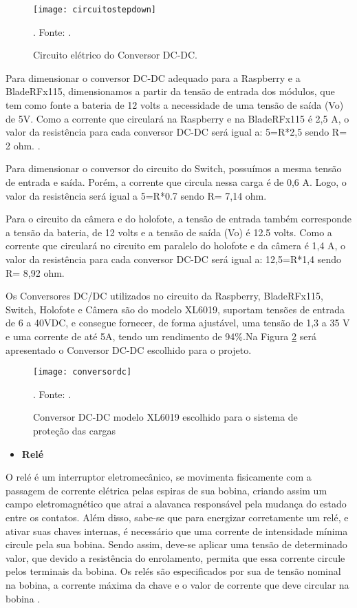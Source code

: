 \begin{figure}[H]
\centering
\texttt{[image: circuitostepdown]}
    \caption{Circuito elétrico do Conversor DC-DC.}. Fonte: \cite{Amauri}.
\label{fig:circuitostepdown}
\end{figure}
\FloatBarrier

Para dimensionar o conversor DC-DC adequado para a Raspberry e a BladeRFx115, dimensionamos a partir da tensão de entrada dos módulos, que tem como fonte a bateria de 12 volts a necessidade de uma tensão de saída (Vo) de 5V. Como a corrente que circulará na Raspberry e na BladeRFx115  é 2,5 A, o valor da resistência para cada conversor DC-DC será igual a: 5=R*2,5 sendo R= 2 ohm. \cite{MSM}.

Para dimensionar o conversor do circuito do Switch, possuímos a mesma tensão de entrada e saída. Porém, a corrente que circula nessa carga é de 0,6 A. Logo, o valor da resistência será igual a 5=R*0.7 sendo R= 7,14 ohm.

Para o circuito da câmera e do holofote, a tensão de entrada também corresponde a tensão da bateria, de 12 volts e a tensão de saída (Vo) é 12.5 volts. Como a corrente que circulará no circuito em paralelo do holofote e da câmera é 1,4 A, o valor da resistência para cada conversor DC-DC será igual a: 12,5=R*1,4 sendo R= 8,92 ohm.

Os Conversores DC/DC utilizados no circuito da Raspberry, BladeRFx115, Switch, Holofote e Câmera são do modelo XL6019, suportam tensões de entrada de 6 a 40VDC, e consegue fornecer, de forma ajustável, uma tensão de 1,3 a 35 V e uma corrente de até 5A, tendo um rendimento de 94\%.Na Figura \ref{fig:conversordc} será apresentado o Conversor DC-DC escolhido para o projeto.

\begin{figure}[H]
\centering
\texttt{[image: conversordc]}
    \caption{Conversor DC-DC modelo XL6019 escolhido para o sistema de proteção das cargas}. Fonte: \cite{conversor}.
\label{fig:conversordc}
\end{figure}
\FloatBarrier


\begin{itemize}

    \item \textbf{Relé}
    
\end{itemize}

O relé é um interruptor eletromecânico, se movimenta fisicamente com a passagem de corrente elétrica pelas espiras de sua bobina, criando assim um campo eletromagnético que atrai a alavanca responsável pela mudança do estado entre os contatos. Além disso, sabe-se que para energizar corretamente um relé, e ativar suas chaves internas, é necessário que uma corrente de intensidade mínima circule pela sua bobina. Sendo assim, deve-se aplicar uma tensão de determinado valor, que devido a resistência do enrolamento, permita que essa corrente circule pelos terminais da bobina. Os relés são especificados por sua de tensão nominal na bobina, a corrente máxima da chave e o valor de corrente que deve circular na bobina \cite{Braga}.

